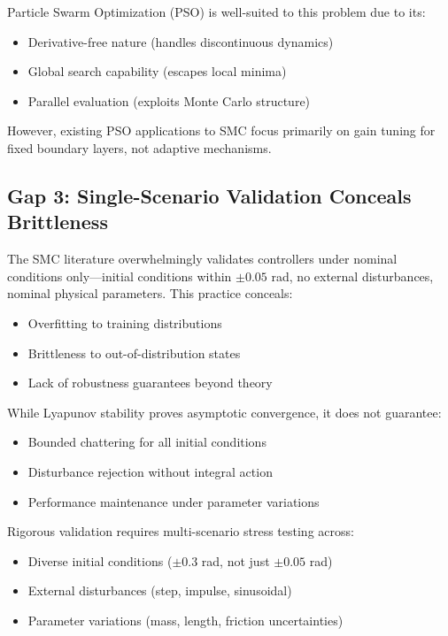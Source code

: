 Particle Swarm Optimization (PSO) is well-suited to this problem due to its:
\begin{itemize}
    \item Derivative-free nature (handles discontinuous dynamics)
    \item Global search capability (escapes local minima)
    \item Parallel evaluation (exploits Monte Carlo structure)
\end{itemize}

However, existing PSO applications to SMC \cite{swaroop2000dynamic, gao2016particle} focus primarily on gain tuning for fixed boundary layers, not adaptive mechanisms.

\subsection{Gap 3: Single-Scenario Validation Conceals Brittleness}

The SMC literature overwhelmingly validates controllers under nominal conditions only—initial conditions within $\pm0.05$ rad, no external disturbances, nominal physical parameters. This practice conceals:
\begin{itemize}
    \item Overfitting to training distributions
    \item Brittleness to out-of-distribution states
    \item Lack of robustness guarantees beyond theory
\end{itemize}

While Lyapunov stability proves asymptotic convergence, it does not guarantee:
\begin{itemize}
    \item Bounded chattering for all initial conditions
    \item Disturbance rejection without integral action
    \item Performance maintenance under parameter variations
\end{itemize}

Rigorous validation requires multi-scenario stress testing across:
\begin{itemize}
    \item Diverse initial conditions ($\pm0.3$ rad, not just $\pm0.05$ rad)
    \item External disturbances (step, impulse, sinusoidal)
    \item Parameter variations (mass, length, friction uncertainties)
\end{itemize}

